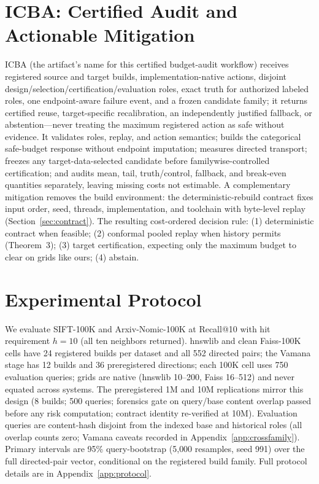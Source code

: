 \documentclass{article}
\begin{document}
\section{ICBA: Certified Audit and Actionable Mitigation}
\label{sec:icba}

ICBA (the artifact's name for this certified budget-audit workflow) receives registered source and target
builds, implementation-native actions, disjoint
design/selection/certification/evaluation roles, exact truth for authorized labeled roles, one
endpoint-aware failure event, and a frozen candidate family; it returns certified reuse, target-specific
recalibration, an independently justified fallback, or abstention---never treating the maximum registered
action as safe without evidence. It validates roles, replay, and action semantics; builds the categorical
safe-budget response without endpoint imputation; measures directed transport; freezes any
target-data-selected candidate before familywise-controlled certification; and audits mean, tail,
truth/control, fallback, and break-even quantities separately, leaving missing costs not estimable. A
complementary mitigation removes the build environment: the deterministic-rebuild contract fixes input
order, seed, threads, implementation, and toolchain with byte-level replay (Section~\ref{sec:contract}).
The resulting cost-ordered decision rule: (1) deterministic contract when feasible; (2) conformal pooled
replay when history permits (Theorem~3); (3) target certification, expecting only the maximum budget to
clear on grids like ours; (4) abstain.

\section{Experimental Protocol}
\label{sec:protocol}

We evaluate SIFT-100K and Arxiv-Nomic-100K at Recall@10 with hit requirement $h{=}10$ (all ten
neighbors returned). hnswlib and clean Faiss-100K cells have 24 registered builds per dataset and all 552
directed pairs; the Vamana stage has 12 builds and 36 preregistered directions; each 100K cell uses 750
evaluation queries; grids are native (hnswlib 10--200, Faiss 16--512) and never equated across systems.
The preregistered 1M and 10M replications mirror this design (8 builds; 500 queries; forensics gate on
query/base content overlap passed before any risk computation; contract identity re-verified at 10M).
Evaluation queries are content-hash disjoint from the indexed base and historical roles (all overlap
counts zero; Vamana caveats recorded in Appendix~\ref{app:crossfamily}). Primary intervals are 95\%
query-bootstrap (5{,}000 resamples, seed 991) over the full directed-pair vector, conditional on the
registered build family. Full protocol details are in Appendix~\ref{app:protocol}.
\end{document}
